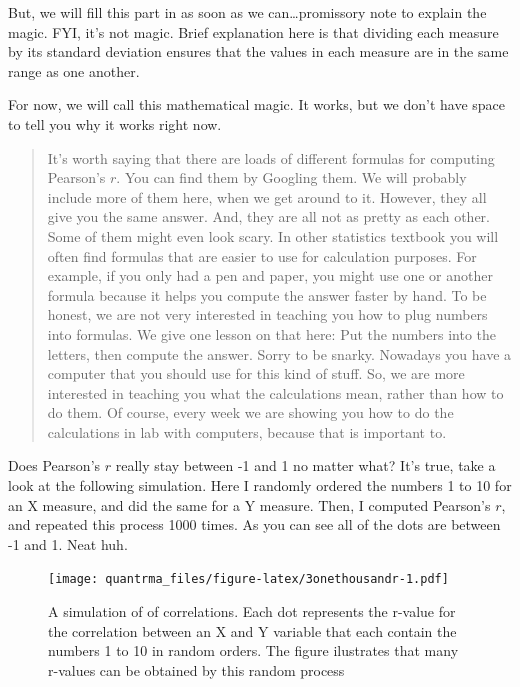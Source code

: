 \documentclass[
]{book}
\begin{document}
\begin{marginnote}

But, we will fill this part in as soon as we can\ldots promissory note to explain the magic. FYI, it's not magic. Brief explanation here is that dividing each measure by its standard deviation ensures that the values in each measure are in the same range as one another.

\end{marginnote}

For now, we will call this mathematical magic. It works, but we don't have space to tell you why it works right now.

\begin{quote}
It's worth saying that there are loads of different formulas for computing Pearson's \(r\). You can find them by Googling them. We will probably include more of them here, when we get around to it. However, they all give you the same answer. And, they are all not as pretty as each other. Some of them might even look scary. In other statistics textbook you will often find formulas that are easier to use for calculation purposes. For example, if you only had a pen and paper, you might use one or another formula because it helps you compute the answer faster by hand. To be honest, we are not very interested in teaching you how to plug numbers into formulas. We give one lesson on that here: Put the numbers into the letters, then compute the answer. Sorry to be snarky. Nowadays you have a computer that you should use for this kind of stuff. So, we are more interested in teaching you what the calculations mean, rather than how to do them. Of course, every week we are showing you how to do the calculations in lab with computers, because that is important to.
\end{quote}

Does Pearson's \(r\) really stay between -1 and 1 no matter what? It's true, take a look at the following simulation. Here I randomly ordered the numbers 1 to 10 for an X measure, and did the same for a Y measure. Then, I computed Pearson's \(r\), and repeated this process 1000 times. As you can see all of the dots are between -1 and 1. Neat huh.

\begin{figure}
\centering
\texttt{[image: quantrma\_files/figure-latex/3onethousandr-1.pdf]}
\caption{\label{fig:3onethousandr}A simulation of of correlations. Each dot represents the r-value for the correlation between an X and Y variable that each contain the numbers 1 to 10 in random orders. The figure ilustrates that many r-values can be obtained by this random process}
\end{figure}
\end{document}
